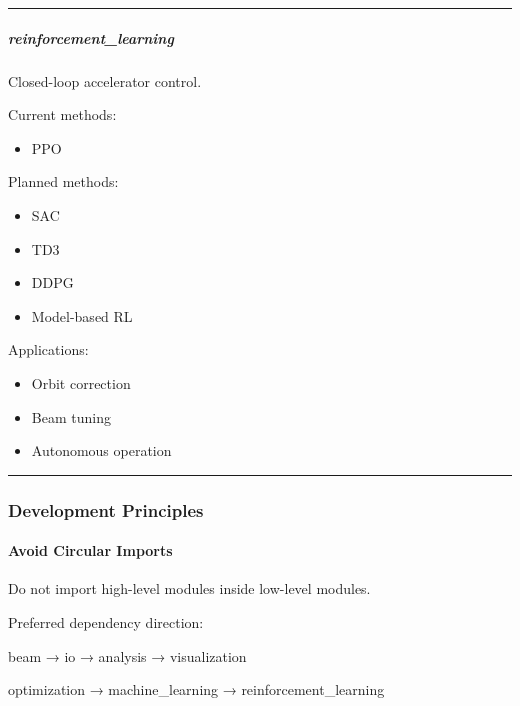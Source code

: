 \documentclass[
]{article}
\providecommand{\tightlist}{%
  \setlength{\itemsep}{0pt}\setlength{\parskip}{0pt}}
\begin{document}
\begin{center}\rule{0.5\linewidth}{0.5pt}\end{center}

\hypertarget{reinforcement_learning}{%
\subparagraph{reinforcement\_learning}\label{reinforcement_learning}}

Closed-loop accelerator control.

Current methods:

\begin{itemize}
\tightlist
\item
  PPO
\end{itemize}

Planned methods:

\begin{itemize}
\tightlist
\item
  SAC
\item
  TD3
\item
  DDPG
\item
  Model-based RL
\end{itemize}

Applications:

\begin{itemize}
\tightlist
\item
  Orbit correction
\item
  Beam tuning
\item
  Autonomous operation
\end{itemize}

\begin{center}\rule{0.5\linewidth}{0.5pt}\end{center}

\hypertarget{development-principles}{%
\subsubsection{Development Principles}\label{development-principles}}

\hypertarget{avoid-circular-imports}{%
\paragraph{Avoid Circular Imports}\label{avoid-circular-imports}}

Do not import high-level modules inside low-level modules.

Preferred dependency direction:

beam → io → analysis → visualization

optimization → machine\_learning → reinforcement\_learning
\end{document}
